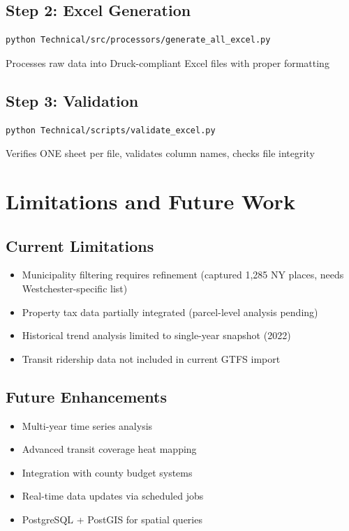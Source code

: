 \documentclass[11pt,letterpaper]{article}
\begin{document}
\subsection{Step 2: Excel Generation}
\begin{verbatim}
python Technical/src/processors/generate_all_excel.py
\end{verbatim}
Processes raw data into Druck-compliant Excel files with proper formatting

\subsection{Step 3: Validation}
\begin{verbatim}
python Technical/scripts/validate_excel.py
\end{verbatim}
Verifies ONE sheet per file, validates column names, checks file integrity

\section{Limitations and Future Work}

\subsection{Current Limitations}
\begin{itemize}
    \item Municipality filtering requires refinement (captured 1,285 NY places, needs Westchester-specific list)
    \item Property tax data partially integrated (parcel-level analysis pending)
    \item Historical trend analysis limited to single-year snapshot (2022)
    \item Transit ridership data not included in current GTFS import
\end{itemize}

\subsection{Future Enhancements}
\begin{itemize}
    \item Multi-year time series analysis
    \item Advanced transit coverage heat mapping
    \item Integration with county budget systems
    \item Real-time data updates via scheduled jobs
    \item PostgreSQL + PostGIS for spatial queries
\end{itemize}
\end{document}
